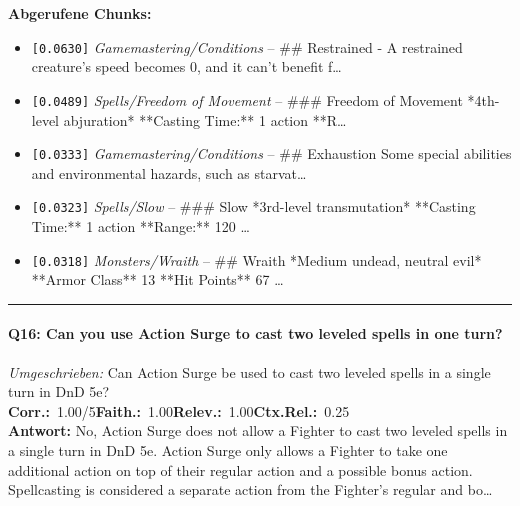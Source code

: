\noindent\textbf{Abgerufene Chunks:}
\begin{itemize}[noitemsep, topsep=2pt]
  \item[\textbf{\#1}] \texttt{[0.0630]} \textit{Gamemastering/Conditions} -- \#\# Restrained  - A restrained creature's speed becomes 0, and it can't benefit f\ldots
  \item[\textbf{\#2}] \texttt{[0.0489]} \textit{Spells/Freedom of Movement} -- \#\#\# Freedom of Movement  *4th-level abjuration*  **Casting Time:** 1 action  **R\ldots
  \item[\textbf{\#3}] \texttt{[0.0333]} \textit{Gamemastering/Conditions} -- \#\# Exhaustion  Some special abilities and environmental hazards, such as starvat\ldots
  \item[\textbf{\#4}] \texttt{[0.0323]} \textit{Spells/Slow} -- \#\#\# Slow  *3rd-level transmutation*  **Casting Time:** 1 action  **Range:** 120 \ldots
  \item[\textbf{\#5}] \texttt{[0.0318]} \textit{Monsters/Wraith} -- \#\# Wraith  *Medium undead, neutral evil*  **Armor Class** 13  **Hit Points** 67 \ldots
\end{itemize}
\vspace{4pt}
\hrule
\vspace{6pt}

\paragraph{Q16: Can you use Action Surge to cast two leveled spells in one turn?}
\textit{Umgeschrieben:} Can Action Surge be used to cast two leveled spells in a single turn in DnD 5e?\\[2pt]
\noindent \textbf{Corr.:}~1.00/5\quad \textbf{Faith.:}~1.00\quad \textbf{Relev.:}~1.00\quad \textbf{Ctx.Rel.:}~0.25\\

\noindent\textbf{Antwort:} No, Action Surge does not allow a Fighter to cast two leveled spells in a single turn in DnD 5e. Action Surge only allows a Fighter to take one additional action on top of their regular action and a possible bonus action. Spellcasting is considered a separate action from the Fighter's regular and bo\ldots

